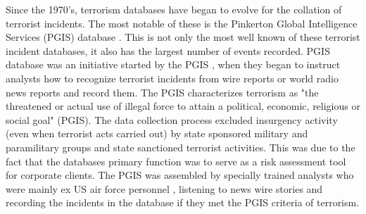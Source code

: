 Since the 1970's, terrorism databases have began to evolve for the collation of terrorist incidents. The most notable of these is the Pinkerton Global Intelligence Services (PGIS) database \citep{dugan2006first}. This is not only the most well known of these terrorist incident databases, it also has the largest number of events recorded. PGIS database was an initiative started by the PGIS \citep{sheehan2012assessing}, when they began to instruct analysts how to recognize terrorist incidents from wire reports or world radio news reports and record them. The PGIS characterizes terrorism as "the threatened or actual use of illegal force to attain a political, economic, religious or social goal" (PGIS). The data collection process excluded insurgency activity (even when terrorist acts carried out) by state sponsored military and paramilitary groups and state sanctioned terrorist activities. This was due to the fact that the databases primary function was to serve as a risk assessment tool for corporate clients. The PGIS was assembled by specially trained analysts who were mainly ex US air force personnel \citep{fivethirtyeightGTD2015}, listening to news wire stories and recording the incidents in the database if they met the PGIS criteria of terrorism. 

